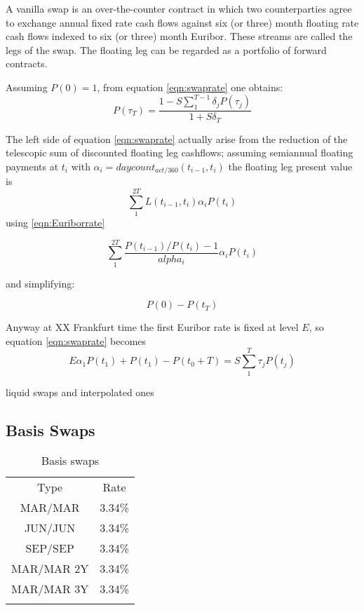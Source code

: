 \documentclass[11pt,reqno]{amsart}
\begin{document}
A vanilla swap is an over-the-counter contract in which two counterparties agree to exchange annual fixed rate cash flows against six (or three) month floating rate cash flows indexed to six (or three) month Euribor. These streams are called the legs of the swap. The floating leg can be regarded as a portfolio of forward contracts.

Assuming $P(0)=1$, from equation \ref{eqn:swaprate} one obtains:
\begin{equation}
P(\tau_T) = \frac
    {1 - S \sum_1^{T-1} \delta_j P(\tau_j)}
    {1+S \delta_T}
\label{eqn:discfromswaprate}
\end{equation}

The left side of equation \ref{eqn:swaprate} actually arise from the reduction of the telescopic sum of discounted floating leg cashflows; assuming semiannual floating payments at $t_i$ with $\alpha_i=daycount_{act/360}(t_{i-1},t_i) $ the floating leg present value is
\begin{equation}
\sum_1^{2T} L(t_{i-1},t_i) \alpha_i P(t_i)
\label{eqn:discfloatlegcf}
\end{equation}
using \ref{eqn:Euriborrate}

\begin{equation}
\sum_1^{2T} \frac{P(t_{i-1}) / P(t_i) - 1}{alpha_i} \alpha_i P(t_i)
\end{equation}

and simplifying:

\begin{equation}
P(0)-P(t_T)
\end{equation}

Anyway at XX Frankfurt time the first Euribor rate is fixed at level $E$, so equation \ref{eqn:swaprate} becomes
\begin{equation}
E \alpha_1 P(t_1) + P(t_1) - P(t_0+T) = S \sum_1^T \tau_j P(t_j)
\label{eqn:swapratewithfixingeffect}
\end{equation}


liquid swaps and interpolated ones


\subsection{\label{SecBasis}Basis Swaps}
\begin{table}[tbp]
\label{tab:basisSwaps}
\begin{tabular}{cc}
Type & Rate \\
MAR/MAR & 3.34\% \\
JUN/JUN & 3.34\% \\
SEP/SEP & 3.34\% \\
MAR/MAR 2Y & 3.34\% \\
MAR/MAR 3Y & 3.34\% \\
&
\end{tabular}%
\caption{Basis swaps}
\end{table}
\end{document}

